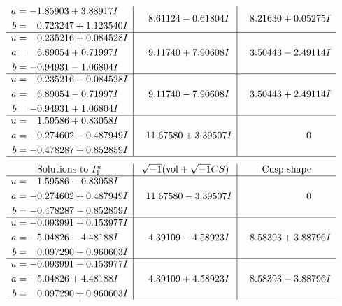 \documentclass[1p]{elsarticle_modified}
\theoremstyle{definition}
\newcommand{\I}{\sqrt{-1}}
\begin{document}
$$\begin{array}{c|c|c}
\begin{aligned}
a &= -1.85903 + 3.88917 I \\
b &= \phantom{-}0.723247 + 1.123540 I\end{aligned}
 & \phantom{-}8.61124 - 0.61804 I & \phantom{-}8.21630 + 0.05275 I \\ \hline\begin{aligned}
u &= \phantom{-}0.235216 + 0.084528 I \\
a &= \phantom{-}6.89054 + 0.71997 I \\
b &= -0.94931 - 1.06804 I\end{aligned}
 & \phantom{-}9.11740 + 7.90608 I & \phantom{-}3.50443 - 2.49114 I \\ \hline\begin{aligned}
u &= \phantom{-}0.235216 - 0.084528 I \\
a &= \phantom{-}6.89054 - 0.71997 I \\
b &= -0.94931 + 1.06804 I\end{aligned}
 & \phantom{-}9.11740 - 7.90608 I & \phantom{-}3.50443 + 2.49114 I \\ \hline\begin{aligned}
u &= \phantom{-}1.59586 + 0.83058 I \\
a &= -0.274602 - 0.487949 I \\
b &= -0.478287 + 0.852859 I\end{aligned}
 & \phantom{-}11.67580 + 3.39507 I & \phantom{-0.000000 } 0\\
 \hline 
 \end{array}$$\newpage$$\begin{array}{c|c|c}  
\text{Solutions to }I^u_{1}& \I (\text{vol} + \sqrt{-1}CS) & \text{Cusp shape}\\
 \hline 
\begin{aligned}
u &= \phantom{-}1.59586 - 0.83058 I \\
a &= -0.274602 + 0.487949 I \\
b &= -0.478287 - 0.852859 I\end{aligned}
 & \phantom{-}11.67580 - 3.39507 I & \phantom{-0.000000 } 0 \\ \hline\begin{aligned}
u &= -0.093991 + 0.153977 I \\
a &= -5.04826 - 4.48188 I \\
b &= \phantom{-}0.097290 - 0.960603 I\end{aligned}
 & \phantom{-}4.39109 - 4.58923 I & \phantom{-}8.58393 + 3.88796 I \\ \hline\begin{aligned}
u &= -0.093991 - 0.153977 I \\
a &= -5.04826 + 4.48188 I \\
b &= \phantom{-}0.097290 + 0.960603 I\end{aligned}
 & \phantom{-}4.39109 + 4.58923 I & \phantom{-}8.58393 - 3.88796 I\\
 \hline 
 \end{array}$$\newpage\newpage\renewcommand{\arraystretch}{1}
\end{document}
